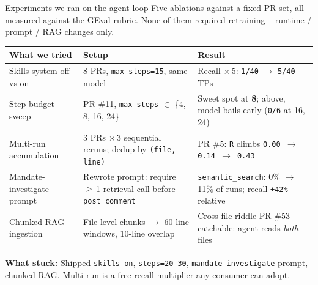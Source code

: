 \documentclass[10pt,aspectratio=169]{beamer}
\begin{document}
\begin{frame}{Experiments we ran on the agent loop}
  \footnotesize Five ablations against a fixed PR set, all measured against the GEval rubric.
  None of them required retraining -- runtime / prompt / RAG changes only.
  \vspace{0.4em}

  \scriptsize
  \begin{tabular}{@{}p{} p{} p{}@{}}
    \toprule
    \textbf{What we tried} & \textbf{Setup} & \textbf{Result} \\
    \midrule
    Skills system off vs on
      & 8 PRs, \texttt{max-steps=15}, same model
      & \alert{Recall $\times$\,5}: \texttt{1/40} $\rightarrow$ \texttt{5/40} TPs \\[2pt]
    Step-budget sweep
      & PR \#11, \texttt{max-steps} $\in$ \{4, 8, 16, 24\}
      & Sweet spot at \textbf{8}; above, model bails early (\texttt{0/6} at 16, 24) \\[2pt]
    Multi-run accumulation
      & 3 PRs $\times$\,3 sequential reruns; dedup by \texttt{(file, line)}
      & PR \#5: \texttt{R} climbs \texttt{0.00 $\rightarrow$ 0.14 $\rightarrow$ 0.43} \\[2pt]
    Mandate-investigate prompt
      & Rewrote prompt: require $\geq$\,1 retrieval call before \texttt{post\_comment}
      & \texttt{semantic\_search}: \alert{0\% $\rightarrow$ 11\%} of runs; recall \texttt{+42\%} relative \\[2pt]
    Chunked RAG ingestion
      & File-level chunks $\rightarrow$ 60-line windows, 10-line overlap
      & Cross-file riddle PR \#53 catchable: agent reads \emph{both} files \\
    \bottomrule
  \end{tabular}
  \vspace{6pt}

  \footnotesize\textbf{What stuck:} \scriptsize Shipped \texttt{skills-on}, \texttt{steps=20--30},
  \texttt{mandate-investigate} prompt, chunked RAG. Multi-run is a free recall multiplier any
  consumer can adopt.
  \vspace{0.4em}
\end{frame}
\end{document}
